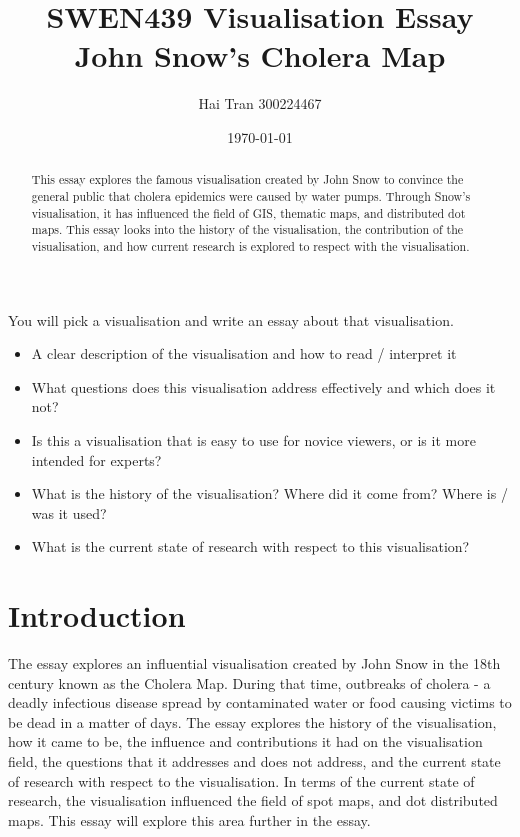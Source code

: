 \documentclass[12pt]{article}
\title{SWEN439 Visualisation Essay \\ John Snow's Cholera Map}
\author{Hai Tran 300224467}
\date{\today}
\begin{document}
\maketitle 

\begin{abstract}
This essay explores the famous visualisation created by John Snow to convince the general public that cholera epidemics were caused by water pumps. Through Snow's visualisation, it has influenced the field of GIS, thematic maps, and distributed dot maps. This essay looks into the history of the visualisation, the contribution of the visualisation, and how current research is explored to respect with the visualisation.

\end{abstract}

You will pick a visualisation and write an essay about that visualisation. 
 
\begin{itemize}
\item A clear description of the visualisation and how to read / interpret it
\item What questions does this visualisation address effectively and which does it not?
\item Is this a visualisation that is easy to use for novice viewers, or is it more intended for experts?
\item What is the history of the visualisation? Where did it come from? Where is / was it used?
\item What is the current state of research with respect to this visualisation?
\end{itemize}

\section{Introduction}

The essay explores an influential visualisation created by John Snow in the 18th century known as the Cholera Map. During that time, outbreaks of cholera - a deadly infectious disease spread by contaminated water or food causing victims to be dead in a matter of days. The essay explores the history of the visualisation, how it came to be, the influence and contributions it had on the visualisation field, the questions that it addresses and does not address, and the current state of research with respect to the visualisation. In terms of the current state of research, the visualisation influenced the field of spot maps, and dot distributed maps. This essay will explore this area further in the essay.
\end{document}
